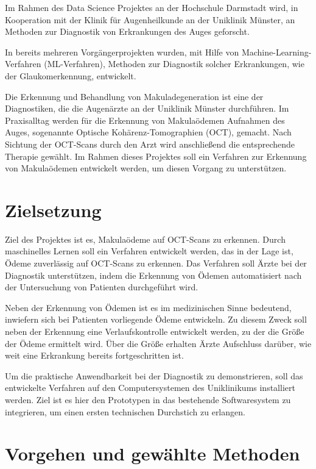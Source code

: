 Im Rahmen des Data Science Projektes an der Hochschule Darmstadt wird, in Kooperation mit der Klinik für Augenheilkunde an der Uniklinik Münster, an Methoden zur Diagnostik von Erkrankungen des Auges geforscht. 

In bereits mehreren Vorgängerprojekten wurden, mit Hilfe von Machine-Learning-Verfahren (ML-Verfahren), Methoden zur Diagnostik solcher Erkrankungen, wie der Glaukomerkennung, entwickelt.

Die Erkennung und Behandlung von Makuladegeneration ist eine der Diagnostiken, die die Augenärzte an der Uniklinik Münster durchführen. Im Praxisalltag werden für die Erkennung von Makulaödemen Aufnahmen des Auges, sogenannte Optische Kohärenz-Tomographien (OCT), gemacht. Nach Sichtung der OCT-Scans durch den Arzt wird anschließend die entsprechende Therapie gewählt. Im Rahmen dieses Projektes soll ein Verfahren zur Erkennung von Makulaödemen entwickelt werden, um diesen Vorgang zu unterstützen.

\section{Zielsetzung}

Ziel des Projektes ist es, Makulaödeme auf OCT-Scans zu erkennen.
Durch maschinelles Lernen soll ein Verfahren entwickelt werden, das in der Lage ist, Ödeme zuverlässig auf OCT-Scans zu erkennen. 
Das Verfahren soll Ärzte bei der Diagnostik unterstützen, indem die Erkennung von Ödemen automatisiert nach der Untersuchung von Patienten durchgeführt wird.

Neben der Erkennung von Ödemen ist es im medizinischen Sinne bedeutend, inwiefern sich bei Patienten vorliegende Ödeme entwickeln. Zu diesem Zweck soll neben der Erkennung eine Verlaufskontrolle entwickelt werden, zu der die Größe der Ödeme ermittelt wird. Über die Größe erhalten Ärzte Aufschluss darüber, wie weit eine Erkrankung bereits fortgeschritten ist.

Um die praktische Anwendbarkeit bei der Diagnostik zu demonstrieren, soll das entwickelte Verfahren auf den Computersystemen des Uniklinikums installiert werden. 
Ziel ist es hier den Prototypen in das bestehende Softwaresystem zu integrieren, um einen ersten technischen Durchstich zu erlangen.

\newpage
\section{Vorgehen und gewählte Methoden}

